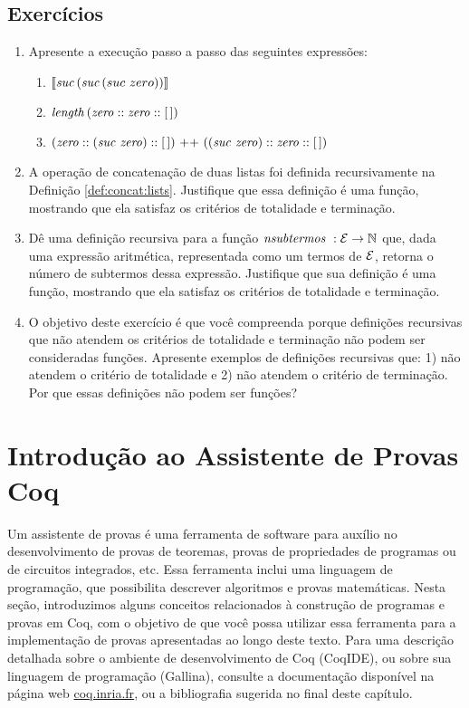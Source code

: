 \subsection{Exerc\'icios}

\begin{enumerate}
  \item Apresente a execu\c{c}\~ao passo a passo das seguintes express\~oes:
  \begin{enumerate}
    \item $\llbracket \textit{suc\/}\, (\textit{suc\/}\, (suc\,\,zero))\rrbracket$ 
    \item $\textit{length\/}\, (\textit{zero\/} :: \textit{zero\/} :: [\,])$
    \item $(\textit{zero\/} :: (\textit{suc\/}\,\, \textit{zero\/}) ::[\,])\text{ ++ }((\textit{suc\/}\,\,\textit{zero\/}) :: \textit{zero\/} :: [\,])$
  \end{enumerate}
  \item A operação de concatenação de duas listas foi definida recursivamente na Definição \ref{def:concat:lists}. Justifique que essa definição é uma fun\c{c}\~ao, mostrando que ela satisfaz  os critérios de totalidade e termina\c{c}\~ao.
  \item Dê uma defini\c{c}\~ao recursiva para a função $\textit{nsubtermos }: \mathcal{E} \rightarrow \mathbb{N}$ que, dada uma express\~ao aritm\'etica, representada como um termos de $\mathcal{E}$, retorna o número de subtermos dessa expressão. Justifique que sua definição é uma função, mostrando que ela satisfaz os critérios de totalidade e termina\c{c}\~ao.
  \item O objetivo deste exerc\'icio \'e que você compreenda porque defini\c{c}\~oes recursivas que n\~ao atendem os crit\'erios de totalidade e termina\c{c}\~ao n\~ao podem ser consideradas fun\c{c}\~oes. 
        Apresente exemplos de defini\c{c}\~oes recursivas que: 1) n\~ao atendem o crit\'erio de totalidade e 2) n\~ao atendem o crit\'erio de termina\c{c}\~ao. Por que essas definições n\~ao podem ser fun\c{c}\~oes?        
\end{enumerate}

\section{Introdu\c{c}\~ao ao Assistente de Provas Coq}\label{cap1:coq}

Um assistente de provas \'e uma ferramenta de software para auxílio no desenvolvimento de provas de teoremas, provas de propriedades de programas ou de circuitos integrados, etc. Essa ferramenta inclui uma linguagem de programa\c{c}\~ao, que possibilita descrever  algoritmos e provas matem\'aticas. Nesta seção, introduzimos alguns conceitos relacionados à construção de programas e provas em Coq, com o objetivo de que você possa utilizar essa ferramenta para a implementação de provas apresentadas ao longo deste texto. Para uma descrição detalhada sobre o ambiente de desenvolvimento de Coq (CoqIDE), ou sobre sua linguagem de programação (Gallina), consulte a documentação disponível na página web \url{coq.inria.fr}, ou a bibliografia sugerida no final deste capítulo. 

